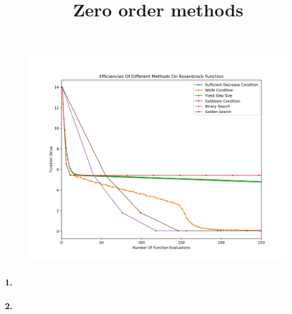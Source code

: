 \documentclass{article}
\newcommand*{\1}{\mathbf{1}}
\begin{document}
\begin{figure}[H]
    \centering
    \includegraphics[scale=0.8]{rosenbrock_efficiencies.png}
\end{figure}

\title{Zero order methods}
\maketitle
\paragraph{1.}
\paragraph{2.}
\end{document}
